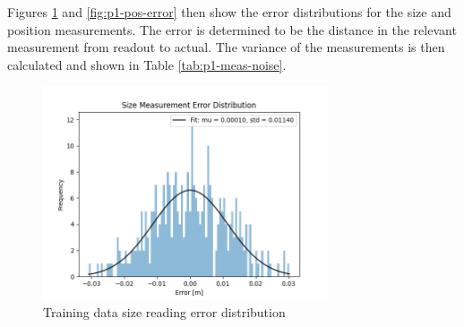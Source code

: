 \documentclass[12pt]{article}
\begin{document}
Figures \ref{fig:p1-size-error} and \ref{fig:p1-pos-error} then show the error distributions for the size and position measurements. The error is determined to be the distance in the relevant measurement from readout to actual. The variance of the measurements is then calculated and shown in Table \ref{tab:p1-meas-noise}.

\begin{figure}[H]
    \centering
    \includegraphics[width=0.75\textwidth]{Problem 1/out/p1_size_error_hist.png}
    \caption{Training data size reading error distribution}
    \label{fig:p1-size-error}
\end{figure}
\end{document}
